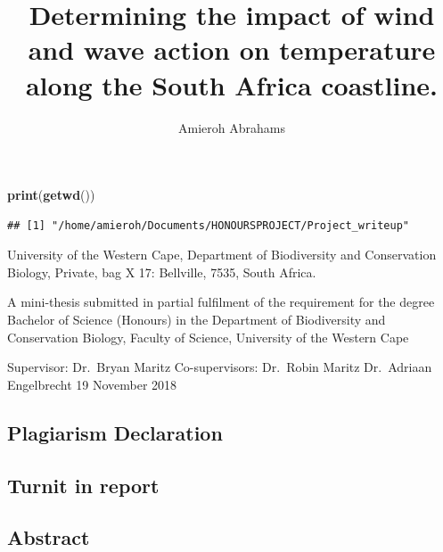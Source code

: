 \documentclass[12pt,A4paper,]{article}
\title{Determining the impact of wind and wave action on temperature along the
South Africa coastline.}
\author{Amieroh Abrahams}
\date{}
\newenvironment{Shaded}{\begin{snugshade}}{\end{snugshade}}
\newcommand{\KeywordTok}[1]{\textcolor[rgb]{0.13,0.29,0.53}{\textbf{#1}}}
\newcommand{\NormalTok}[1]{#1}
\begin{document}
\maketitle

{
\setcounter{tocdepth}{4}
\tableofcontents
}
\begin{Shaded}
\begin{Highlighting}[]
\KeywordTok{print}\NormalTok{(}\KeywordTok{getwd}\NormalTok{())}
\end{Highlighting}
\end{Shaded}

\begin{verbatim}
## [1] "/home/amieroh/Documents/HONOURSPROJECT/Project_writeup"
\end{verbatim}

\newpage

University of the Western Cape, Department of Biodiversity and
Conservation Biology, Private, bag X 17: Bellville, 7535, South Africa.

A mini-thesis submitted in partial fulfilment of the requirement for the
degree Bachelor of Science (Honours) in the Department of Biodiversity
and Conservation Biology, Faculty of Science, University of the Western
Cape

Supervisor: Dr.~Bryan Maritz Co-supervisors: Dr.~Robin Maritz
Dr.~Adriaan Engelbrecht 19 November 2018

\newpage

\subsection{Plagiarism Declaration}\label{plagiarism-declaration}

\newpage

\subsection{Turnit in report}\label{turnit-in-report}

\newpage

\subsection{Abstract}\label{abstract}
\end{document}
